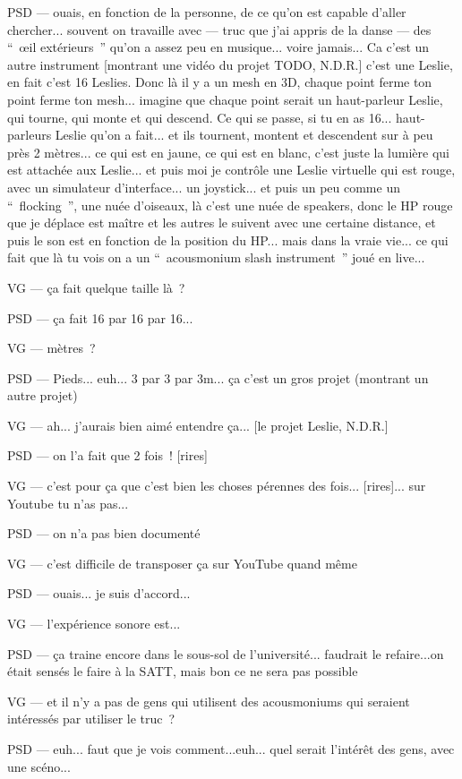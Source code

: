 PSD — ouais, en fonction de la personne, de ce qu'on est capable d'aller chercher... souvent on travaille avec — truc que j'ai appris de la danse — des “ œil extérieurs ” qu'on a assez peu en musique... voire jamais... Ca c'est un autre instrument [montrant une vidéo du projet TODO,  N.D.R.] c'est une Leslie, en fait c'est 16 Leslies. Donc là il y a un mesh en 3D, chaque point ferme ton point ferme ton mesh... imagine que chaque point serait un haut-parleur Leslie, qui tourne, qui monte et qui descend. Ce qui se passe, si tu en as 16... haut-parleurs Leslie qu'on a fait... et ils tournent, montent et descendent sur à peu près 2 mètres... ce qui est en jaune, ce qui est en blanc, c'est juste la lumière qui est attachée aux Leslie... et puis moi je contrôle une Leslie virtuelle qui est rouge, avec un simulateur d'interface... un joystick... et puis un peu comme un “ flocking ”, une nuée d'oiseaux, là c'est une nuée de speakers, donc le HP rouge que je déplace est maître et les autres le suivent avec une certaine distance, et puis le son est en fonction de la position du HP... mais dans la vraie vie... ce qui fait que là tu vois on a un “ acousmonium slash instrument ” joué en live... 

VG — ça fait quelque taille là ?

PSD — ça fait 16 par 16 par 16... 

VG — mètres ?

PSD — Pieds... euh... 3 par 3 par 3m... ça c'est un gros projet (montrant un autre projet)

VG — ah... j'aurais bien aimé entendre ça... [le projet Leslie,  N.D.R.]

PSD — on l'a fait que 2 fois ! [rires]

VG — c'est pour ça que c'est bien les choses pérennes des fois... [rires]... sur Youtube tu n'as pas...

PSD — on n'a pas bien documenté

VG — c'est difficile de transposer ça sur YouTube quand même

PSD — ouais... je suis d'accord...

VG — l'expérience sonore est...

PSD — ça traine encore dans le sous-sol de l'université... faudrait le refaire...on était sensés le faire à la SATT, mais bon ce ne sera pas possible

VG — et il n'y a pas de gens qui utilisent des acousmoniums qui seraient intéressés par utiliser le truc ?

PSD — euh... faut que je vois comment...euh... quel serait l'intérêt des gens, avec une scéno...

